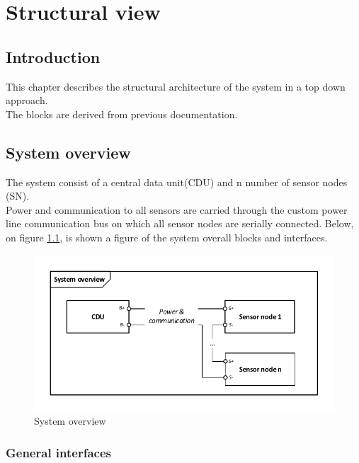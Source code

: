 \chapter{Structural view}

\section{Introduction}
This chapter describes the structural architecture of the system in a top down approach.\\
The blocks are derived from previous documentation.


\section{System overview}
The system consist of a central data unit(CDU) and n number of sensor nodes (SN).\\
Power and communication to all sensors are carried through the custom power line communication bus on which all sensor nodes are serially connected. Below, on figure \ref{fig:systembdd}, is shown a figure of the system overall blocks and interfaces.
\begin{figure}[hbpt]
	\centering
	\includegraphics[width=.9\textwidth]{billeder/systembdd}
	\caption{System overview}
	\label{fig:systembdd}
\end{figure}

\subsection{General interfaces}

